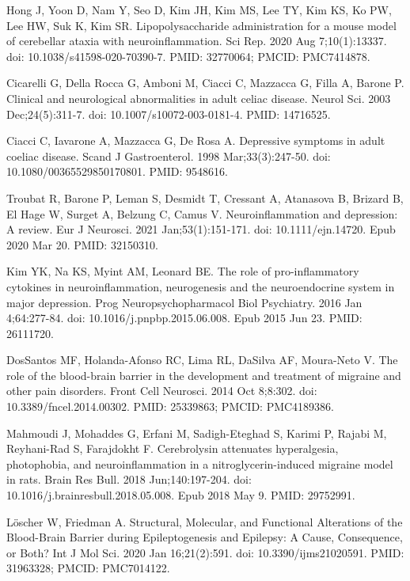 \documentclass{article}
\begin{document}
\begin{thebibliography}{9}
Hong J, Yoon D, Nam Y, Seo D, Kim JH, Kim MS, Lee TY, Kim KS, Ko PW, Lee HW, Suk K, Kim SR. Lipopolysaccharide administration for a mouse model of cerebellar ataxia with neuroinflammation. Sci Rep. 2020 Aug 7;10(1):13337. doi: 10.1038/s41598-020-70390-7. PMID: 32770064; PMCID: PMC7414878.

Cicarelli G, Della Rocca G, Amboni M, Ciacci C, Mazzacca G, Filla A, Barone P. Clinical and neurological abnormalities in adult celiac disease. Neurol Sci. 2003 Dec;24(5):311-7. doi: 10.1007/s10072-003-0181-4. PMID: 14716525.

Ciacci C, Iavarone A, Mazzacca G, De Rosa A. Depressive symptoms in adult coeliac disease. Scand J Gastroenterol. 1998 Mar;33(3):247-50. doi: 10.1080/00365529850170801. PMID: 9548616.

Troubat R, Barone P, Leman S, Desmidt T, Cressant A, Atanasova B, Brizard B, El Hage W, Surget A, Belzung C, Camus V. Neuroinflammation and depression: A review. Eur J Neurosci. 2021 Jan;53(1):151-171. doi: 10.1111/ejn.14720. Epub 2020 Mar 20. PMID: 32150310.

Kim YK, Na KS, Myint AM, Leonard BE. The role of pro-inflammatory cytokines in neuroinflammation, neurogenesis and the neuroendocrine system in major depression. Prog Neuropsychopharmacol Biol Psychiatry. 2016 Jan 4;64:277-84. doi: 10.1016/j.pnpbp.2015.06.008. Epub 2015 Jun 23. PMID: 26111720.

DosSantos MF, Holanda-Afonso RC, Lima RL, DaSilva AF, Moura-Neto V. The role of the blood-brain barrier in the development and treatment of migraine and other pain disorders. Front Cell Neurosci. 2014 Oct 8;8:302. doi: 10.3389/fncel.2014.00302. PMID: 25339863; PMCID: PMC4189386.

Mahmoudi J, Mohaddes G, Erfani M, Sadigh-Eteghad S, Karimi P, Rajabi M, Reyhani-Rad S, Farajdokht F. Cerebrolysin attenuates hyperalgesia, photophobia, and neuroinflammation in a nitroglycerin-induced migraine model in rats. Brain Res Bull. 2018 Jun;140:197-204. doi: 10.1016/j.brainresbull.2018.05.008. Epub 2018 May 9. PMID: 29752991.

Löscher W, Friedman A. Structural, Molecular, and Functional Alterations of the Blood-Brain Barrier during Epileptogenesis and Epilepsy: A Cause, Consequence, or Both? Int J Mol Sci. 2020 Jan 16;21(2):591. doi: 10.3390/ijms21020591. PMID: 31963328; PMCID: PMC7014122.


\end{thebibliography}
\end{document}
